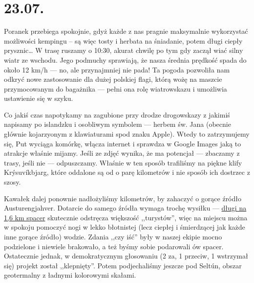 \chapter*{23.07.}

Poranek przebiega spokojnie, gdyż każde z nas pragnie maksymalnie wykorzystać możliwości kempingu -- są więc tosty i herbata na śniadanie, potem długi ciepły prysznic… W trasę ruszamy o 10:30, akurat chwilę po tym gdy zaczął wiać silny wiatr ze wschodu. Jego podmuchy sprawiają, że nasza średnia prędkość spada do około 12 km/h --- no, ale przynajmniej nie pada! Ta pogoda pozwoliła nam odkryć nowe zastosowanie dla dużej polskiej flagi, którą wożę na maszcie przymocowanym do bagażnika --- pełni ona rolę wiatrowskazu i umożliwia ustawienie się w szyku.


Co jakiś czas napotykamy na zagubione przy drodze drogowskazy z jakimiś napisamy po islandzku i osobliwym symbolem --- herbem św. Jana (obecnie głównie kojarzyonym z klawiaturami spod znaku Apple). Wtedy to zatrzymujemy się, Put wyciąga komórkę, włącza internet i sprawdza w Google Images jaką to atrakcje właśnie mijamy. Jeśli ze zdjęć wynika, że ma potencjał --- zbaczamy z trasy, jeśli nie --- odpuszczamy. Właśnie w ten sposób trafiliśmy na piękne klify Krýsuvíkbjarg, które oddalone są od  o parę kilometrów i nie sposób ich dostrzec z szosy.


Kawałek dalej ponownie nadłożyliśmy kilometrów, by zahaczyć o gorące źródło Austurengjahver. Dotarcie do samego źródła wymaga trochę wysiłku --- \href{http://www.openstreetmap.org/way/33182596}{długi na 1,6 km spacer} skutecznie odstręcza większość ,,turystów'', więc na miejscu można w spokoju pomoczyć nogi w lekko błotnistej (lecz ciepłej i śmierdzącej jak każde inne gorące źródło) wodzie. Zdania ,,czy iść'' były w naszej ekipie mocno podzielone i niewiele brakowało, a też byśmy sobie podarowali ów spacer. Ostatecznie jednak, w demokratycznym głosowaniu (2 za, 1 przeciw, 1 wstrzymał się) projekt został ,,klepnięty''. Potem podjechaliśmy jeszcze pod Seltún, obszar geotermalny z ładnymi kolorowymi skałami.

